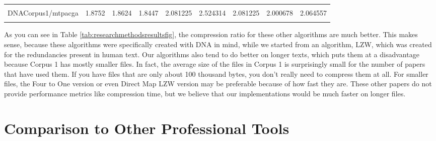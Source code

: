 \documentclass[12pt,twoside]{reedthesis}
\begin{document}
\begin{table}[!h]
{\begin{tabular}[t]{lrrrrrrrr}
\cellcolor{gray!6}{DNACorpus1/mpomtcg} & \cellcolor{gray!6}{1.9378} & \cellcolor{gray!6}{1.9058} & \cellcolor{gray!6}{1.8768} & \cellcolor{gray!6}{2.172671} & \cellcolor{gray!6}{2.485925} & \cellcolor{gray!6}{2.172671} & \cellcolor{gray!6}{2.000375} & \cellcolor{gray!6}{2.053449}\\
DNACorpus1/mtpacga & 1.8752 & 1.8624 & 1.8447 & 2.081225 & 2.524314 & 2.081225 & 2.000678 & 2.064557\\
\addlinespace
\cellcolor{gray!6}{DNACorpus1/vaccg} & \cellcolor{gray!6}{1.7614} & \cellcolor{gray!6}{1.7614} & \cellcolor{gray!6}{1.7649} & \cellcolor{gray!6}{2.108805} & \cellcolor{gray!6}{2.413347} & \cellcolor{gray!6}{2.108805} & \cellcolor{gray!6}{2.000365} & \cellcolor{gray!6}{2.065162}\\
\bottomrule
\end{tabular}}
\end{table}
As you can see in Table \ref{tab:researchmethodsresultsfig}, the compression ratio for these other algorithms are much better. This makes sense, because these algorithms were specifically created with DNA in mind, while we started from an algorithm, LZW, which was created for the redundancies present in human text. Our algorithms also tend to do better on longer texts, which puts them at a disadvantage because Corpus 1 has mostly smaller files. In fact, the average size of the files in Corpus 1 is surprisingly small for the number of papers that have used them. If you have files that are only about 100 thousand bytes, you don't really need to compress them at all. For smaller files, the Four to One version or even Direct Map LZW version may be preferable because of how fast they are. These other papers do not provide performance metrics like compression time, but we believe that our implementations would be much faster on longer files.

\hypertarget{comparison-to-other-professional-tools}{%
\section{Comparison to Other Professional Tools}\label{comparison-to-other-professional-tools}}
\end{document}
